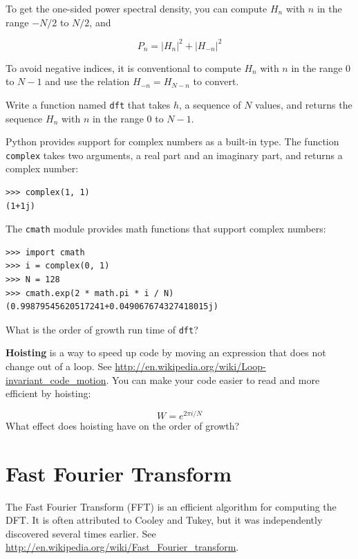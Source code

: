 \documentclass[10pt]{book}
\begin{document}
To get the one-sided power spectral density, you can compute $H_n$
with $n$ in the range $-N/2$ to $N/2$, and

\[ P_n = |H_n|^2 + |H_{-n}|^2 \]

To avoid negative indices, it is conventional to compute
$H_n$ with $n$ in the range $0$ to $N-1$ and use the relation
$H_{-n} = H_{N-n}$ to convert.

\begin{ex}

Write a function named {\tt dft} that takes $h$, a sequence of $N$
values, and returns the sequence $H_n$ with $n$ in the range $0$ to
$N-1$.

Python provides support for complex numbers as a built-in type.
The function {\tt complex} takes two arguments, a real part
and an imaginary part, and returns a complex number:

\begin{verbatim}
>>> complex(1, 1)
(1+1j)
\end{verbatim}

The {\tt cmath} module provides math functions that support
complex numbers:

\begin{verbatim}
>>> import cmath
>>> i = complex(0, 1)
>>> N = 128
>>> cmath.exp(2 * math.pi * i / N)
(0.99879545620517241+0.049067674327418015j)

\end{verbatim}

What is the order of growth run time of {\tt dft}?

{\bf Hoisting} is a way to speed up code by moving an
expression that does not change out of a loop.
See \url{http://en.wikipedia.org/wiki/Loop-invariant_code_motion}.
You can make your code easier to read and more efficient
by hoisting:

\begin{equation}
W = e^{2 \pi i / N}
\end{equation}
%
What effect does hoisting have on the order of growth?

\end{ex}


\section{Fast Fourier Transform}
 
The Fast Fourier Transform (FFT) is an efficient algorithm for
computing the DFT.  It is often attributed to Cooley and Tukey,
but it was independently discovered several times earlier.
See \url{http://en.wikipedia.org/wiki/Fast_Fourier_transform}.
\end{document}
